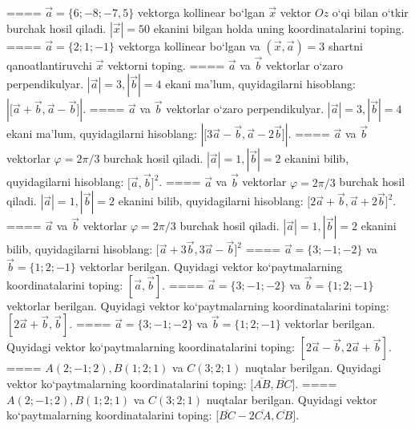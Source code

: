 ====
$\vec{a} = \{ 6; - 8; - 7,5\}$ vektorga kollinear bo‘lgan $\vec{x}$ vektor $Oz$ o‘qi bilan o‘tkir burchak hosil qiladi. $|\vec{x}| = 50$ ekanini bilgan holda uning koordinatalarini toping.
====
$\vec{a} = \{ 2;1; - 1\}$ vektorga kollinear bo‘lgan va $\left(\vec{x},\vec{a} \right) = 3$ shartni qanoatlantiruvchi $\vec{x}$ vektorni toping.
====
$\vec{a}$ va $\vec{b}$ vektorlar o‘zaro perpendikulyar. $|\vec{a}| = 3,|\vec{b}| = 4$ ekani ma’lum, quyidagilarni hisoblang:
$|\lbrack\vec{a} + \vec{b},\vec{a} - \vec{b}\rbrack|$.
====
$\vec{a}$ va $\vec{b}$ vektorlar o‘zaro perpendikulyar. $|\vec{a}| = 3,|\vec{b}| = 4$ ekani ma’lum, quyidagilarni hisoblang:
$|\lbrack 3\vec{a} - \vec{b},\vec{a}-2\vec{b}\rbrack|$.
====
$\vec{a}$ va $\vec{b}$ vektorlar $\varphi = 2\pi/3$ burchak hosil qiladi. $|\vec{a}| = 1,|\vec{b}| = 2$ ekanini bilib, quyidagilarni hisoblang:
$\lbrack\vec{a},\vec{b}\rbrack^{2}$.
====
$\vec{a}$ va $\vec{b}$ vektorlar $\varphi = 2\pi/3$ burchak hosil qiladi. $|\vec{a}| = 1,|\vec{b}| = 2$ ekanini bilib, quyidagilarni hisoblang:
$\lbrack 2\overrightarrow{a} + \overrightarrow{b},\overrightarrow{a} + 2\overrightarrow{b}\rbrack^{2}$.
====
$\vec{a}$ va $\vec{b}$ vektorlar $\varphi = 2\pi/3$ burchak hosil qiladi. $|\vec{a}| = 1,|\vec{b}| = 2$ ekanini bilib, quyidagilarni hisoblang:
$\lbrack\overrightarrow{a} + 3\overrightarrow{b},3\overrightarrow{a} - \overrightarrow{b}\rbrack^{2}$
====
$\vec{a} = \{ 3; - 1; - 2\}$ va $\vec{b} = \{ 1;2; - 1\}$ vektorlar berilgan. Quyidagi vektor ko‘paytmalarning koordinatalarini toping:
$\left\lbrack \vec{a},\vec{b} \right\rbrack$.
====
$\vec{a} = \{ 3; - 1; - 2\}$ va $\vec{b} = \{ 1;2; - 1\}$ vektorlar berilgan. Quyidagi vektor ko‘paytmalarning koordinatalarini toping:
$\left\lbrack 2\vec{a} + \vec{b},\vec{b} \right\rbrack$.
====
$\vec{a} = \{ 3; - 1; - 2\}$ va $\vec{b} = \{ 1;2; - 1\}$ vektorlar berilgan. Quyidagi vektor ko‘paytmalarning koordinatalarini toping:
$\left\lbrack 2\vec{a} - \vec{b},2\vec{a} + \vec{b} \right\rbrack$.
====
$A (2; -1;2),B (1;2; 1) $ va $C (3;2;1)$ nuqtalar berilgan. Quyidagi vektor ko‘paytmalarning koordinatalarini toping:
$\lbrack\overline{AB},\overline{BC}\rbrack$.
====
$A (2; -1;2),B (1;2; 1) $ va $C (3;2;1) $ nuqtalar berilgan. Quyidagi vektor ko‘paytmalarning koordinatalarini toping:
$\lbrack\overline{BC} - 2\overline{CA},\overline{CB}\rbrack$.